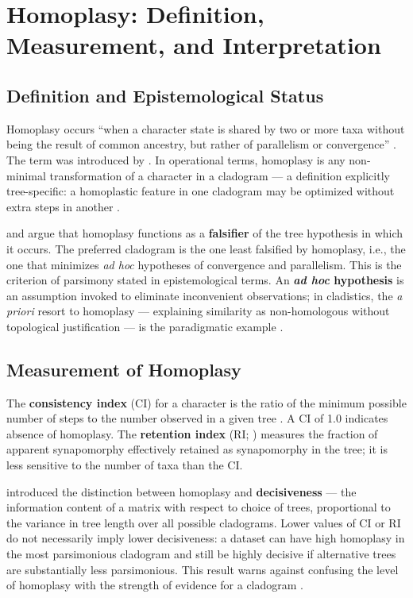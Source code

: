 \section{Homoplasy: Definition, Measurement, and Interpretation}
\label{sec:homoplasia}

\subsection{Definition and Epistemological Status}

Homoplasy occurs ``when a character state is shared by two or more taxa without being the result of common ancestry, but rather of parallelism or convergence'' \parencite[p.~336]{wheeleretal2006}. The term was introduced by \textcite{lankester1870}. In operational terms, homoplasy is any non-minimal transformation of a character in a cladogram --- a definition explicitly tree-specific: a homoplastic feature in one cladogram may be optimized without extra steps in another \parencite{wheeler2012}.

\textcite{farris1983} and \textcite{kluge2009} argue that homoplasy functions as a \textbf{falsifier} of the tree hypothesis in which it occurs. The preferred cladogram is the one least falsified by homoplasy, i.e., the one that minimizes \textit{ad hoc} hypotheses of convergence and parallelism. This is the criterion of parsimony stated in epistemological terms. An \textbf{\textit{ad hoc} hypothesis} is an assumption invoked to eliminate inconvenient observations; in cladistics, the \textit{a priori} resort to homoplasy --- explaining similarity as non-homologous without topological justification --- is the paradigmatic example \parencite{grant2004a}.

\subsection{Measurement of Homoplasy}

The \textbf{consistency index} (CI) for a character is the ratio of the minimum possible number of steps to the number observed in a given tree \parencite{klugeanfarris1969}. A CI of 1.0 indicates absence of homoplasy. The \textbf{retention index} (RI; \cite{farris1989}) measures the fraction of apparent synapomorphy effectively retained as synapomorphy in the tree; it is less sensitive to the number of taxa than the CI.

\textcite{goloboff1991} introduced the distinction between homoplasy and \textbf{decisiveness} --- the information content of a matrix with respect to choice of trees, proportional to the variance in tree length over all possible cladograms. Lower values of CI or RI do not necessarily imply lower decisiveness: a dataset can have high homoplasy in the most parsimonious cladogram and still be highly decisive if alternative trees are substantially less parsimonious. This result warns against confusing the level of homoplasy with the strength of evidence for a cladogram \parencite{goloboff1991}.

